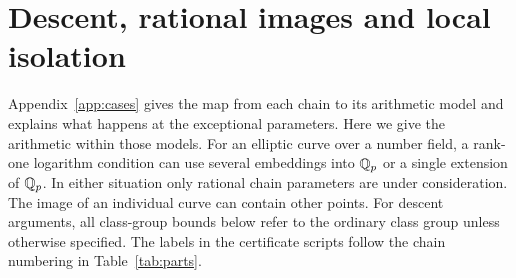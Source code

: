 \section{Descent, rational images and local isolation}\label{app:details}
Appendix~\ref{app:cases} gives the map from each chain to its arithmetic model and explains what happens at the exceptional parameters. Here we give the arithmetic within those models. For an elliptic curve over a number field, a rank-one logarithm condition can use several embeddings into \(\mathbb Q_p\) or a single extension of \(\mathbb Q_p\). In either situation only rational chain parameters are under consideration. The image of an individual curve can contain other points. For descent arguments, all class-group bounds below refer to the ordinary class group unless otherwise specified. The labels in the certificate scripts follow the chain numbering in Table~\ref{tab:parts}.



